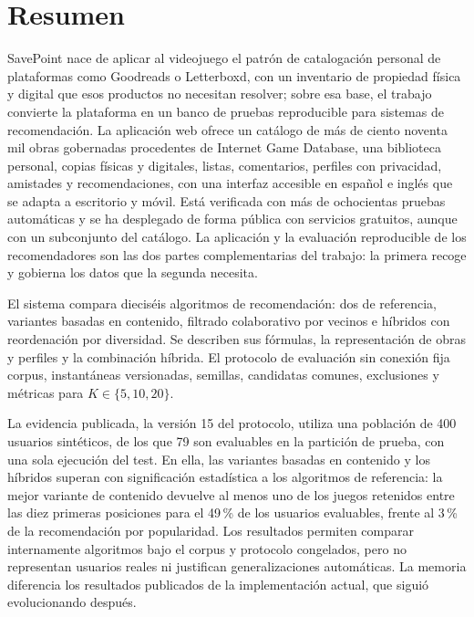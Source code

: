 \chapter*{Resumen}

SavePoint nace de aplicar al videojuego el patrón de catalogación personal de plataformas como Goodreads o Letterboxd, con un inventario de propiedad física y digital que esos productos no necesitan resolver; sobre esa base, el trabajo convierte la plataforma en un banco de pruebas reproducible para sistemas de recomendación. La aplicación web ofrece un catálogo de más de ciento noventa mil obras gobernadas procedentes de Internet Game Database, una biblioteca personal, copias físicas y digitales, listas, comentarios, perfiles con privacidad, amistades y recomendaciones, con una interfaz accesible en español e inglés que se adapta a escritorio y móvil. Está verificada con más de ochocientas pruebas automáticas y se ha desplegado de forma pública con servicios gratuitos, aunque con un subconjunto del catálogo. La aplicación y la evaluación reproducible de los recomendadores son las dos partes complementarias del trabajo: la primera recoge y gobierna los datos que la segunda necesita.

El sistema compara dieciséis algoritmos de recomendación: dos de referencia, variantes basadas en contenido, filtrado colaborativo por vecinos e híbridos con reordenación por diversidad. Se describen sus fórmulas, la representación de obras y perfiles y la combinación híbrida. El protocolo de evaluación sin conexión fija corpus, instantáneas versionadas, semillas, candidatas comunes, exclusiones y métricas para $K\in\{5,10,20\}$.

La evidencia publicada, la versión 15 del protocolo, utiliza una población de 400 usuarios sintéticos, de los que 79 son evaluables en la partición de prueba, con una sola ejecución del test. En ella, las variantes basadas en contenido y los híbridos superan con significación estadística a los algoritmos de referencia: la mejor variante de contenido devuelve al menos uno de los juegos retenidos entre las diez primeras posiciones para el 49\,\% de los usuarios evaluables, frente al 3\,\% de la recomendación por popularidad. Los resultados permiten comparar internamente algoritmos bajo el corpus y protocolo congelados, pero no representan usuarios reales ni justifican generalizaciones automáticas. La memoria diferencia los resultados publicados de la implementación actual, que siguió evolucionando después.

